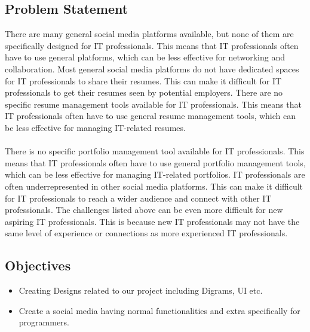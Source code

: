 \documentclass[12pt]{article}
\begin{document}
\subsection{Problem Statement}


There are many general social media platforms available, but none of them are specifically designed for IT professionals. This means that IT professionals often have to use general platforms, which can be less effective for networking and collaboration.
Most general social media platforms do not have dedicated spaces for IT professionals to share their resumes. This can make it difficult for IT professionals to get their resumes seen by potential employers.
There are no specific resume management tools available for IT professionals. This means that IT professionals often have to use general resume management tools, which can be less effective for managing IT-related resumes.\\\\
There is no specific portfolio management tool available for IT professionals. This means that IT professionals often have to use general portfolio management tools, which can be less effective for managing IT-related portfolios.
IT professionals are often underrepresented in other social media platforms. This can make it difficult for IT professionals to reach a wider audience and connect with other IT professionals.
The challenges listed above can be even more difficult for new aspiring IT professionals. This is because new IT professionals may not have the same level of experience or connections as more experienced IT professionals.\\

\subsection{Objectives}
\begin{itemize}
    \item Creating Designs related to our project including Digrams, UI etc.
    \item Create a social media having normal functionalities and extra specifically  for programmers.
\end{itemize}
\end{document}
